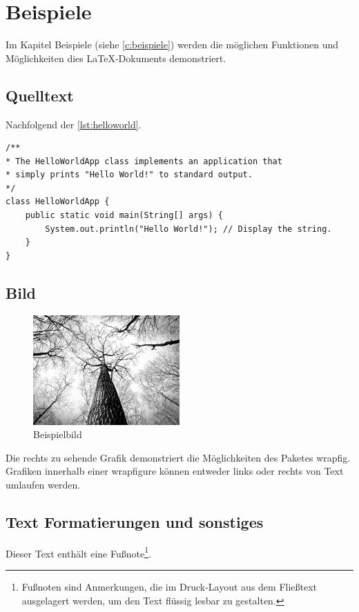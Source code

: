\chapter{Beispiele} \label{c:beispiele}


Im Kapitel Beispiele (siehe \autoref{c:beispiele}) werden die möglichen Funktionen und Möglichkeiten dies LaTeX-Dokuments demonstriert.

\section{Quelltext}

Nachfolgend der \autoref{lst:helloworld}.

\begin{lstlisting}[caption={Hello World}, captionpos=b, label={lst:helloworld}]
/**
* The HelloWorldApp class implements an application that
* simply prints "Hello World!" to standard output.
*/
class HelloWorldApp {
	public static void main(String[] args) {
		System.out.println("Hello World!"); // Display the string.
	}
}
\end{lstlisting}

\section{Bild}

\begin{figure}
	\centering
	\includegraphics[width=0.5\textwidth]{resources/example}
	\caption{Beispielbild {\cite{PEXELS2015}}}
\end{figure}

Die rechts zu sehende Grafik demonstriert die Möglichkeiten des Paketes \glqq wrapfig\grqq . Grafiken innerhalb einer \glqq wrapfigure\grqq{} können entweder links oder rechts von Text umlaufen werden.


\section{Text Formatierungen und sonstiges}
Dieser Text enthält eine Fußnote\footnote{Fußnoten sind Anmerkungen, die im Druck-Layout aus dem Fließtext ausgelagert werden, um den Text flüssig lesbar zu gestalten.}.

